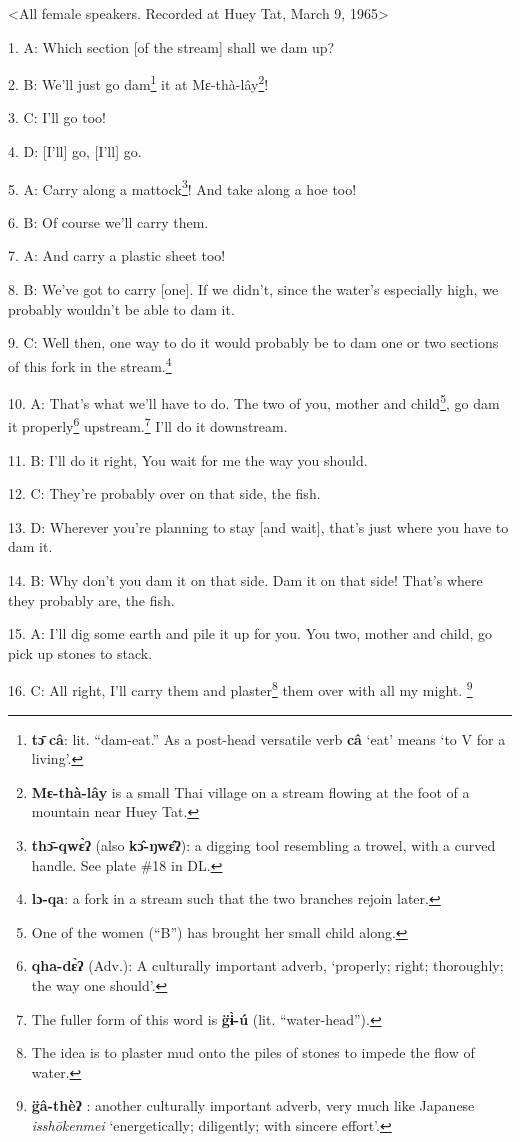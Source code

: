 \setcounter{footnote}{0}

<All female speakers. Recorded at Huey Tat, March 9, 1965>

1. A: Which section [of the stream] shall we dam up?

2. B: We'll just go dam\footnote{\textbf{tɔ̄} \textbf{câ}: lit. ``dam-eat.'' As a post-head versatile verb \textbf{câ} `eat' means `to V for a living'.} it at Mɛ-thà-lây\footnote{\textbf{Mɛ-thà-lây} is a small Thai village on a stream flowing at the foot of a mountain near Huey Tat.}!

3. C: I'll go too!

4. D: [I'll] go, [I'll] go.

5. A: Carry along a mattock\footnote{\textbf{thɔ̄-qwɛ̀ʔ} (also \textbf{kɔ̂-ŋwɛ̂ʔ}): a digging tool resembling a trowel, with a curved handle. See plate \#18 in DL.}! And take along a hoe too!

6. B: Of course we'll carry them.

7. A: And carry a plastic sheet too!

8. B: We've got to carry [one]. If we didn't, since the water's especially high,
we probably wouldn't be able to dam it.

9. C: Well then, one way to do it would probably be to dam one or two sections
of this fork in the stream.\footnote{\textbf{lɔ-qa}: a fork in a stream such that the two branches rejoin later.}

10. A: That's what we'll have to do. The two of you, mother and child\footnote{One of the women (``B'') has brought her small child along.}, go dam
it properly\footnote{\textbf{qha-dɛ̀ʔ} (Adv.): A culturally important adverb, `properly; right; thoroughly; the way one should'.} upstream.\footnote{The fuller form of this word is \textbf{g̈ɨ̀-ú} (lit. ``water-head'').} I'll do it downstream.

11. B: I'll do it right, You wait for me the way you should.

12. C: They're probably over on that side, the fish.

13. D: Wherever you're planning to stay [and wait], that's just where you have
to dam it.

14. B: Why don't you dam it on that side. Dam it on that side! That's where they
probably are, the fish.

15. A: I'll dig some earth and pile it up for you. You two, mother and child,
go pick up stones to stack.

16. C: All right, I'll carry them and plaster\footnote{The idea is to plaster mud onto the piles of stones to impede the flow of water.} them over with all my might.
\footnote{\textbf{g̈â-thèʔ} : another culturally important adverb, very much like Japanese \textit{isshōkenmei} `energetically; diligently; with sincere effort'.}

